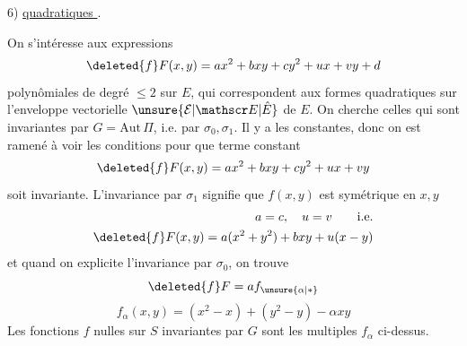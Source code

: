 6) \uline{ quadratiques }.

On s'intéresse aux expressions
\[
\deleted{f}F(x,y)=ax^2+bxy+cy^2+ux+vy+d
\]
polynômiales de degré $\le2$ sur $E$, qui correspondent aux formes quadratiques sur l'enveloppe vectorielle $\unsure{\mathcal E|\mathscr E|\hat E}$ de $E$. On cherche celles qui sont invariantes par $G=\mathrm{Aut}\,\Pi$, i.e. par $\sigma_0,\sigma_1$. Il y a les constantes, donc on est ramené à voir les conditions pour que   terme constant
\[
\deleted{f}F(x,y)=ax^2+bxy+cy^2+ux+vy
\]
soit invariante. L'invariance par $\sigma_1$ signifie que $f(x,y)$ est symétrique en $x,y$
\[
\begin{aligned}
a=c,\quad u=v\qquad \text{i.e.}\\
\deleted{f}F(x,y)=a(x^2+y^2)+bxy+u(x-y)
\end{aligned}
\]
et quand on explicite l'invariance par $\sigma_0$, on trouve
\[
\deleted{f}F=a f_{\unsure{\alpha|*}}
\]
\[
\boxed{f_\alpha(x,y)=(x^2-x)+(y^2-y)-\alpha xy}
\]
Les fonctions $f$  nulles sur $S$ invariantes par $G$ sont les multiples  $f_\alpha$ ci-dessus.

